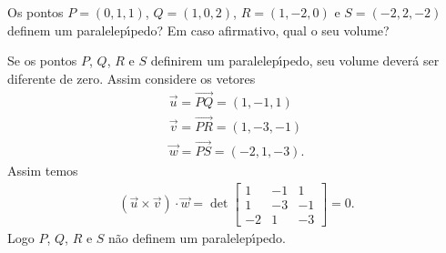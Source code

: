 \begin{exemplo}
  Os pontos $P = (0,1,1)$, $Q = (1,0,2)$, $R = (1,-2,0)$ e $S = (-2,2,-2)$ definem um paralelep{\'\i}pedo? Em caso afirmativo, qual o seu volume?
  \begin{solucao}
    Se os pontos $P$, $Q$, $R$ e $S$ definirem um paralelep{\'\i}pedo, seu volume dever\'a ser diferente de zero. Assim considere os vetores
    \begin{align*}
      \vec{u} = \vec{PQ} = (1,-1,1)\\
      \vec{v} = \vec{PR} = (1,-3,-1)\\
      \vec{w} = \vec{PS} = (-2,1,-3).
    \end{align*}
    Assim temos
    \begin{align*}
      (\vec{u}\times\vec{v})\cdot\vec{w} = \det \begin{bmatrix}
        1 & -1 & 1\\
        1 & -3 & -1\\
        -2 & 1 & -3
      \end{bmatrix} = 0.
    \end{align*}
    Logo $P$, $Q$, $R$ e $S$ n\~ao definem um paralelep{\'\i}pedo.
  \end{solucao}
\end{exemplo}

